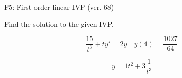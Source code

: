 \begin{exercise}
  \begin{exerciseTitle}F5: First order linear IVP (ver. 68)\end{exerciseTitle}
  \begin{exerciseStatement}
    
Find the solution to the given IVP.

    
\[\frac{15}{t^{3}} +ty'= 2 y \hspace{1em} y( 4 ) = \frac{1027}{64}\]

  \end{exerciseStatement}
  \begin{exerciseAnswer}
    
\[y= 1 t^ 2 +3 \frac{1}{t^{3}}\]

  \end{exerciseAnswer}
\end{exercise}